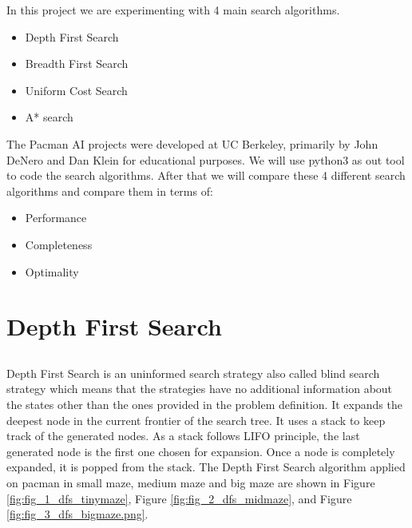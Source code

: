 \documentclass[
10pt, %
a4paper, %
oneside, %
headinclude,footinclude, %
BCOR5mm, %
]{scrartcl}
\begin{document}
In this project we are experimenting with 4 main search algorithms.
\begin{itemize}
    \item Depth First Search
    \item Breadth First Search
    \item Uniform Cost Search
    \item A* search
\end{itemize}
The Pacman AI projects were developed at UC Berkeley, primarily by
John DeNero and Dan Klein \cite{ref_UCB} for educational purposes. We will use python$3$ as out tool to code the search algorithms.
After that we will compare these 4 different search algorithms and compare them in terms of:
\begin{itemize}
    \item Performance
    \item Completeness
    \item Optimality
\end{itemize}





\section{\textbf{Depth First Search}}
\subsection*{}
Depth First Search \cite{ref_russel} is an uninformed search strategy also called blind search strategy which means that the strategies have no additional information about the states other than the ones provided in the problem definition. It expands the deepest node in the current frontier of the search tree. It uses a stack to keep track of the generated nodes. As a stack follows LIFO principle, the last generated node is the first one chosen for expansion. Once a node is completely expanded, it is popped from the stack. The Depth First Search algorithm applied on pacman in small maze, medium maze and big maze are shown in Figure \ref{fig:fig_1_dfs_tinymaze}, Figure \ref{fig:fig_2_dfs_midmaze}, and Figure \ref{fig:fig_3_dfs_bigmaze.png}.
\end{document}
